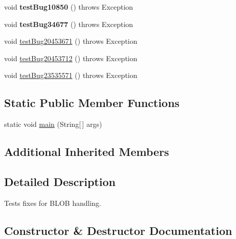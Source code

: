 \begin{DoxyCompactItemize}
void {\bfseries test\+Bug10850} ()  throws Exception 
\item 
\mbox{\label{classtestsuite_1_1regression_1_1_blob_regression_test_a921017ea8c988a3aa23f89888cdde3cb}} 
void {\bfseries test\+Bug34677} ()  throws Exception 
\item 
void \mbox{\hyperlink{classtestsuite_1_1regression_1_1_blob_regression_test_a3e0ce3dcc8dd672e82db74e248d09044}{test\+Bug20453671}} ()  throws Exception 
\item 
void \mbox{\hyperlink{classtestsuite_1_1regression_1_1_blob_regression_test_a044b5dc71a945042d8533a95202d17c4}{test\+Bug20453712}} ()  throws Exception 
\item 
void \mbox{\hyperlink{classtestsuite_1_1regression_1_1_blob_regression_test_ab579f7995a1a9323124bd8ecff9665c8}{test\+Bug23535571}} ()  throws Exception 
\end{DoxyCompactItemize}
\subsection*{Static Public Member Functions}
\begin{DoxyCompactItemize}
\item 
static void \mbox{\hyperlink{classtestsuite_1_1regression_1_1_blob_regression_test_a73ef0a3e9cca8b19e17d3eebc78da04c}{main}} (String\mbox{[}$\,$\mbox{]} args)
\end{DoxyCompactItemize}
\subsection*{Additional Inherited Members}


\subsection{Detailed Description}
Tests fixes for B\+L\+OB handling. 

\subsection{Constructor \& Destructor Documentation}
\mbox{\label{classtestsuite_1_1regression_1_1_blob_regression_test_a960d4c157630ea6a429f73ee43ca0c3a}} 
